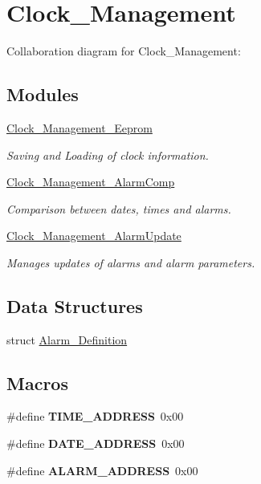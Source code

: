 \hypertarget{group___clock___management}{}\section{Clock\+\_\+\+Management}
\label{group___clock___management}
Collaboration diagram for Clock\+\_\+\+Management\+:
\subsection*{Modules}
\begin{DoxyCompactItemize}
\item 
\hyperlink{group___clock___management___eeprom}{Clock\+\_\+\+Management\+\_\+\+Eeprom}
\begin{DoxyCompactList}\small\item\em Saving and Loading of clock information. \end{DoxyCompactList}\item 
\hyperlink{group___clock___management___alarm_comp}{Clock\+\_\+\+Management\+\_\+\+Alarm\+Comp}
\begin{DoxyCompactList}\small\item\em Comparison between dates, times and alarms. \end{DoxyCompactList}\item 
\hyperlink{group___clock___management___alarm_update}{Clock\+\_\+\+Management\+\_\+\+Alarm\+Update}
\begin{DoxyCompactList}\small\item\em Manages updates of alarms and alarm parameters. \end{DoxyCompactList}\end{DoxyCompactItemize}
\subsection*{Data Structures}
\begin{DoxyCompactItemize}
\item 
struct \hyperlink{struct_alarm___definition}{Alarm\+\_\+\+Definition}
\end{DoxyCompactItemize}
\subsection*{Macros}
\begin{DoxyCompactItemize}
\item 
\mbox{\label{group___clock___management_gadfcd67743c3e3cc2597febabc8d457a8}} 
\#define {\bfseries T\+I\+M\+E\+\_\+\+A\+D\+D\+R\+E\+SS}~0x00
\item 
\mbox{\label{group___clock___management_gaba71f6a7178a51438c696f8b757db85e}} 
\#define {\bfseries D\+A\+T\+E\+\_\+\+A\+D\+D\+R\+E\+SS}~0x00
\item 
\mbox{\label{group___clock___management_ga4faa10811bedb3bafd0bdd926d28d806}} 
\#define {\bfseries A\+L\+A\+R\+M\+\_\+\+A\+D\+D\+R\+E\+SS}~0x00
\end{DoxyCompactItemize}
